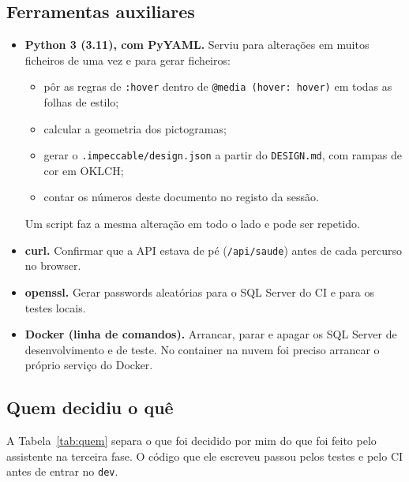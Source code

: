 \documentclass[a4paper,12pt]{article}
\begin{document}
\subsection{Ferramentas auxiliares}

\begin{itemize}
  \item \textbf{Python 3 (3.11), com PyYAML.} Serviu para alterações em muitos ficheiros de uma vez e para gerar ficheiros:
  \begin{itemize}
    \item pôr as regras de \texttt{:hover} dentro de \texttt{@media (hover: hover)} em todas as folhas de estilo;
    \item calcular a geometria dos pictogramas;
    \item gerar o \texttt{.impeccable/design.json} a partir do \texttt{DESIGN.md}, com rampas de cor em OKLCH;
    \item contar os números deste documento no registo da sessão.
  \end{itemize}
  Um script faz a mesma alteração em todo o lado e pode ser repetido.
  \item \textbf{curl.} Confirmar que a API estava de pé (\texttt{/api/saude}) antes de cada percurso no browser.
  \item \textbf{openssl.} Gerar passwords aleatórias para o SQL Server do CI e para os testes locais.
  \item \textbf{Docker (linha de comandos).} Arrancar, parar e apagar os SQL Server de desenvolvimento e de teste. No container na nuvem foi preciso arrancar o próprio serviço do Docker.
\end{itemize}

\subsection{Quem decidiu o quê}

A Tabela~\ref{tab:quem} separa o que foi decidido por mim do que foi feito pelo assistente na terceira fase. O código que ele escreveu passou pelos testes e pelo CI antes de entrar no \texttt{dev}.
\end{document}

